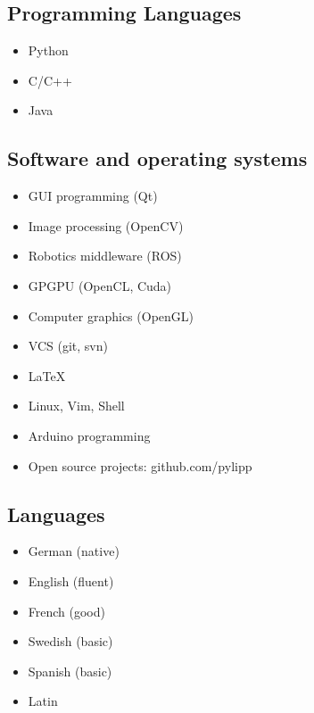 \documentclass[a4paper,10pt]{memoir}
\begin{document}
\subsection*{Programming Languages}
\vspace*{-\baselineskip}
\begin{multicols}{3}
  \begin{itemize}
    \item Python
    \item C/C++
    \item Java
  \end{itemize}
\end{multicols}

\subsection*{Software and operating systems}
\vspace*{-\baselineskip}
\begin{multicols}{2}
\begin{itemize}
  \item GUI programming (Qt)
  \item Image processing (OpenCV)
  \item Robotics middleware (ROS)
  \item GPGPU (OpenCL, Cuda)
  \item Computer graphics (OpenGL)
  \item VCS (git, svn)
  \item \LaTeX
  \item Linux, Vim, Shell
  \item Arduino programming
  \item Open source projects: github.com/pylipp
\end{itemize}
\end{multicols}

\subsection*{Languages}
\vspace*{-\baselineskip}
\begin{multicols}{3}
  \begin{itemize}
    \item German (native)
    \item English (fluent)
    \item French (good)
    \item Swedish (basic)
    \item Spanish (basic)
    \item Latin
  \end{itemize}
\end{multicols}
\end{document}
